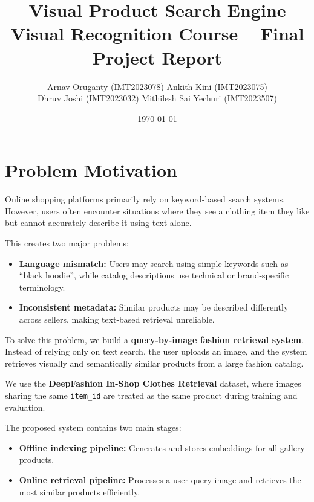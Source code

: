 \documentclass[12pt,a4paper]{article}
\title{
    \vspace{-1cm}
    \textbf{Visual Product Search Engine} \\
    \large Visual Recognition Course -- Final Project Report
}
\author{
    Arnav Oruganty (IMT2023078) \quad
    Ankith Kini (IMT2023075) \\
    Dhruv Joshi (IMT2023032) \quad
    Mithilesh Sai Yechuri (IMT2023507)
}
\date{\today}
\begin{document}
\maketitle
\tableofcontents
\newpage

\section{Problem Motivation}

Online shopping platforms primarily rely on keyword-based search systems.
However, users often encounter situations where they see a clothing item
they like but cannot accurately describe it using text alone.

This creates two major problems:

\begin{itemize}[noitemsep]
    \item \textbf{Language mismatch:} Users may search using simple keywords
          such as ``black hoodie'', while catalog descriptions use technical
          or brand-specific terminology.
    \item \textbf{Inconsistent metadata:} Similar products may be described
          differently across sellers, making text-based retrieval unreliable.
\end{itemize}

To solve this problem, we build a \textbf{query-by-image fashion retrieval
system}. Instead of relying only on text search, the user uploads an image,
and the system retrieves visually and semantically similar products from a
large fashion catalog.

We use the \textbf{DeepFashion In-Shop Clothes Retrieval} dataset, where
images sharing the same \texttt{item\_id} are treated as the same product
during training and evaluation.

The proposed system contains two main stages:

\begin{itemize}[noitemsep]
    \item \textbf{Offline indexing pipeline:} Generates and stores embeddings
          for all gallery products.
    \item \textbf{Online retrieval pipeline:} Processes a user query image
          and retrieves the most similar products efficiently.
\end{itemize}
\end{document}
